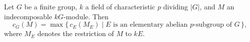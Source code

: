 Let $G$ be a finite group, $k$ a field of characteristic $p$ dividing $|G|$, and $M$ an indecomposable $kG$-module. Then
$$c_G(M) = \max \{\, c_E(M_E) \mid E \text{ is an elementary abelian } p\text{-subgroup of } G \,\},$$
where $M_E$ denotes the restriction of $M$ to $kE$.
